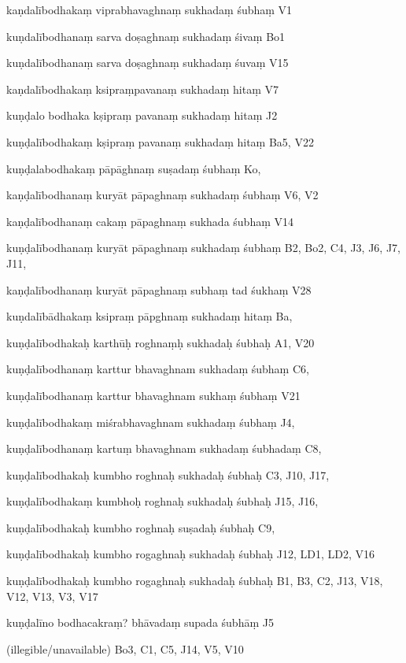 \begin{ekdosis}
\begin{marma}[hp01_055]
\begin{marma}[hp02_009]
\begin{marma}[hp02_011]
\begin{marma}[hp02_67ab]
\item[kaṇdalībodhakaṃ viprabhavaghnaṃ sukhadaṃ śubhaṃ] V1
\item[kuṇdalībodhanaṃ sarva doṣaghnaṃ sukhadaṃ śivaṃ] Bo1
\item[kuṇdalībodhanaṃ sarva doṣaghnaṃ sukhadaṃ śuvaṃ] V15
\item[kaṇdalībodhakaṃ ksipraṃpavanaṃ sukhadaṃ hitaṃ] V7
\item[kuṇḍalo bodhaka kṣipraṃ pavanaṃ sukhadaṃ hitaṃ] J2
\item[kuṇḍalībodhakaṃ kṣipraṃ pavanaṃ sukhadaṃ hitaṃ] Ba5, V22
\item[kuṇḍalabodhakaṃ pāpāghnaṃ suṣadaṃ śubhaṃ] Ko,
\item[kaṇḍalībodhanaṃ kuryāt pāpaghnaṃ sukhadaṃ śubhaṃ] V6, V2
\item[kaṇḍalībodhanaṃ cakaṃ pāpaghnaṃ sukhada śubhaṃ] V14
\item[kuṇḍalībodhanaṃ kuryāt pāpaghnaṃ sukhadaṃ śubhaṃ] B2, Bo2, C4, J3, J6, J7, J11,  
\item[kaṇḍalībodhanaṃ kuryāt pāpaghnaṃ subhaṃ tad śukhaṃ] V28
\item[kuṇdalībādhakaṃ ksipraṃ pāpghnaṃ sukhadaṃ hitaṃ] Ba, 
\item[kuṇḍalībodhakaḥ karthūḥ roghnaṃḥ sukhadaḥ śubhaḥ] A1, V20
\item[kuṇḍalībodhanaṃ karttur bhavaghnam sukhadaṃ śubhaṃ] C6,
\item[kuṇḍalībodhanaṃ karttur bhavaghnam sukhaṃ śubhaṃ] V21
\item[kuṇḍalībodhakaṃ miśrabhavaghnam sukhadaṃ śubhaṃ] J4,
\item[kuṇḍalībodhanaṃ kartuṃ bhavaghnam sukhadaṃ śubhadaṃ] C8,
\item[kuṇḍalībodhakaḥ kumbho roghnaḥ sukhadaḥ śubhaḥ] C3, J10, J17, 
\item[kuṇḍalībodhakaṃ kumbhoḥ roghnaḥ sukhadaḥ śubhaḥ] J15, J16,
\item[kuṇḍalībodhakaḥ kumbho roghnaḥ suṣadaḥ śubhaḥ] C9, 
\item[kuṇḍalībodhakaḥ kumbho rogaghnaḥ sukhadaḥ śubhaḥ] J12, LD1, LD2, V16 
\item[kuṇḍalībodhakaḥ kumbho rogaghnaḥ sukhadaḥ śubhaḥ] B1, B3, C2, J13, V18, V12, V13, V3, V17 
\item[kuṇḍalīno bodhacakraṃ? bhāvadaṃ supada śubhāṃ] J5
\item[(illegible/unavailable)] Bo3, C1, C5, J14, V5, V10
 \begin{description}


\end{description}
\end{marma}
\end{marma}
\end{marma}
\end{marma}
\end{ekdosis}
